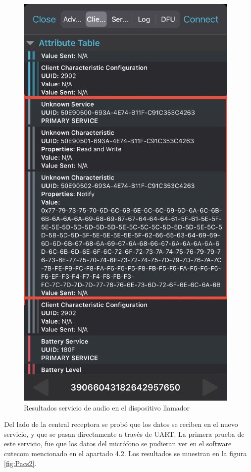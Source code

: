 \begin{figure}[htpb]
	\centering
	\includegraphics[scale=0.5]{./Figures/acsCC.jpeg}	
	\caption{Resultados servicio de audio en el dispositivo llamador}
	\label{fig:Pacs}
\end{figure}

Del lado de la central receptora se probó que los datos se reciben en el nuevo servicio, y que se pasan directamente a través de UART. La primera prueba de este servicio, fue que los datos del micrófono se pudieran ver en el software cutecom mencionado en el apartado 4.2. Los resultados se muestran en la figura \ref{fig:Pacs2}.

